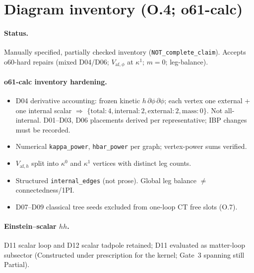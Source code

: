 \section{Diagram inventory (O.4; o61-calc)}
\label{sec:O-inv}

\paragraph{Status.}
Manually specified, partially checked inventory (\texttt{NOT\_complete\_claim}).
Accepts o60-hard repairs (mixed D04/D06; $V_{\mathrm{af},\phi}$ at $\kappa^1$; $m=0$; leg-balance).

\paragraph{o61-calc inventory hardening.}
\begin{itemize}
\item D04 derivative accounting: frozen kinetic $h\,\partial\phi\,\partial\phi$; each vertex one external + one
  internal scalar $\Rightarrow$ $\{\mathrm{total}{:}4,\mathrm{internal}{:}2,\mathrm{external}{:}2,\mathrm{mass}{:}0\}$.
  Not all-internal. D01--D03, D06 placements derived per representative; IBP changes must be recorded.
\item Numerical \texttt{kappa\_power}, \texttt{hbar\_power} per graph; vertex-power sums verified.
\item $V_{\mathrm{af},h}$ split into $\kappa^0$ and $\kappa^1$ vertices with distinct leg counts.
\item Structured \texttt{internal\_edges} (not prose). Global leg balance $\neq$ connectedness/1PI.
\item D07--D09 classical tree seeds excluded from one-loop CT free slots (O.7).
\end{itemize}

\paragraph{Einstein--scalar $hh$.}
D11 scalar loop and D12 scalar tadpole retained; D11 evaluated as matter-loop subsector (Constructed under prescription for the kernel; Gate~3 spanning still Partial).
